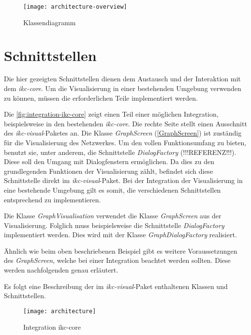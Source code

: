 \begin{landscape}

\begin{figure}[H]
\centering
\texttt{[image: architecture-overview]}
\caption{Klassendiagramm}
\label{fig:klassendiagramm}
\end{figure}
\end{landscape}


\section{Schnittstellen} \label{schnittstellen}

Die hier gezeigten Schnittstellen dienen dem Austausch und der Interaktion mit dem \textit{ikc-core}. Um die Visualisierung in einer bestehenden Umgebung verwenden zu können, müssen die erforderlichen Teile implementiert werden.

Die \autoref{fig:integration-ikc-core} zeigt einen Teil einer möglichen Integration, beispielsweise in den bestehenden \textit{ikc-core}. Die rechte Seite stellt einen Ausschnitt des \textit{ikc-visual}-Paketes an. Die Klasse \textit{GraphScreen} (\autoref{GraphScreen}) ist zu\-stä\-ndig für die Visualisierung des Netzwerkes. Um den vollen Funktionsumfang zu bieten, benutzt sie, unter anderem, die Schnittstelle \textit{DialogFactory} (!!!REFERENZ!!!). Diese soll den Umgang mit Dialogfenstern ermöglichen. Da dies zu den grundlegenden Funktionen der Visualisierung zählt, befindet sich diese Schnittstelle direkt im \textit{ikc-visual}-Paket. Bei der Integration der Visualisierung in eine bestehende Umgebung gilt es somit, die verschiedenen Schnittstellen entsprechend zu implementieren.

Die Klasse \textit{GraphVisualisation} verwendet die Klasse \textit{GraphScreen} aus der Visualisierung. Folglich muss beispielsweise die Schnittstelle \textit{DialogFactory} implementiert werden. Dies wird mit der Klasse \textit{GraphDialogFactory} realisiert.

Ähnlich wie beim oben beschriebenen Beispiel gibt es weitere Voraussetzungen des \textit{GraphScreen}, welche bei einer Integration beachtet werden sollten. Diese werden nachfolgenden genau erläutert.


Es folgt eine Beschreibung der im \textit{ikc-visual}-Paket enthaltenen Klassen und Schnittstellen. 
\begin{figure}[H]
\centering
\texttt{[image: architecture]}
\caption{Integration ikc-core}
\label{fig:integration-ikc-core}
\end{figure}


